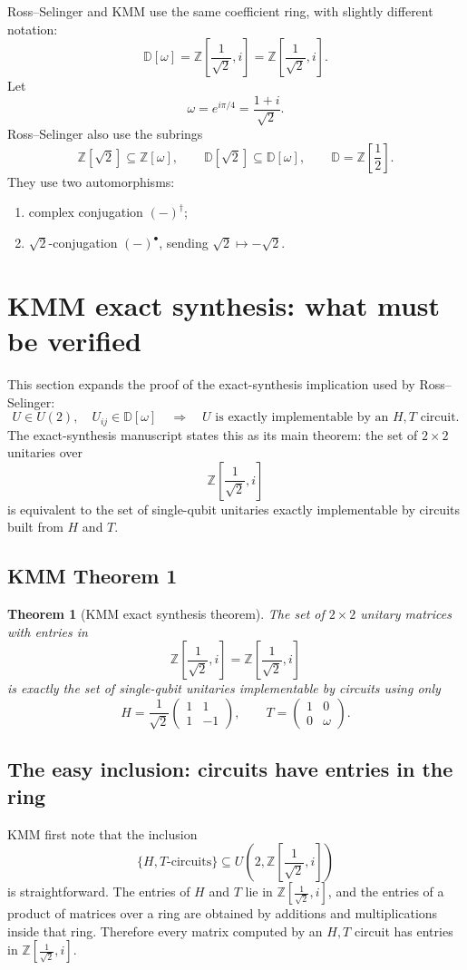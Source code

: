 \documentclass[11pt]{article}
\newtheorem{theorem}{Theorem}[section]
\newcommand{\Z}{\mathbb Z}
\newcommand{\D}{\mathbb D}
\newcommand{\Dw}{\mathbb D[\omega]}
\newcommand{\Zw}{\mathbb Z[\omega]}
\newcommand{\Rring}{\mathbb Z\left[\frac{1}{\sqrt 2},i\right]}
\newcommand{\mat}[1]{\begin{pmatrix}#1\end{pmatrix}}
\begin{document}
Ross--Selinger and KMM use the same coefficient ring, with slightly different notation:
\[
  \Dw=\Z\left[\frac1{\sqrt2},i\right]=\Rring.
\]
Let
\[
  \omega=e^{i\pi/4}=\frac{1+i}{\sqrt2}.
\]
Ross--Selinger also use the subrings
\[
  \Z[\sqrt2]\subseteq \Zw,
  \qquad
  \D[\sqrt2]\subseteq \Dw,
  \qquad
  \D=\Z\left[\frac12\right].
\]
They use two automorphisms:
\begin{enumerate}[label=(\roman*)]
\item complex conjugation $(-)^\dagger$;
\item $\sqrt2$-conjugation $(-)^\bullet$, sending $\sqrt2\mapsto -\sqrt2$.
\end{enumerate}

\section{KMM exact synthesis: what must be verified}

This section expands the proof of the exact-synthesis implication used by Ross--Selinger:
\[
  U\in U(2),\quad U_{ij}\in \Dw
  \quad\Longrightarrow\quad
  U\text{ is exactly implementable by an }H,T\text{ circuit}.
\]
The exact-synthesis manuscript states this as its main theorem: the set of $2\times2$ unitaries over
\[
  \Rring
\]
is equivalent to the set of single-qubit unitaries exactly implementable by circuits built from $H$ and $T$.

\subsection{KMM Theorem 1}

\begin{theorem}[KMM exact synthesis theorem]
The set of $2\times 2$ unitary matrices with entries in
\[
  \Rring=\Z\left[\frac1{\sqrt2},i\right]
\]
is exactly the set of single-qubit unitaries implementable by circuits using only
\[
  H=\frac1{\sqrt2}\mat{1&1\\1&-1},
  \qquad
  T=\mat{1&0\\0&\omega}.
\]
\end{theorem}

\subsection{The easy inclusion: circuits have entries in the ring}

KMM first note that the inclusion
\[
  \{H,T\text{-circuits}\}\subseteq U(2,\Rring)
\]
is straightforward. The entries of $H$ and $T$ lie in $\Rring$, and the entries of a product of matrices over a ring are obtained by additions and multiplications inside that ring. Therefore every matrix computed by an $H,T$ circuit has entries in $\Rring$.
\end{document}

